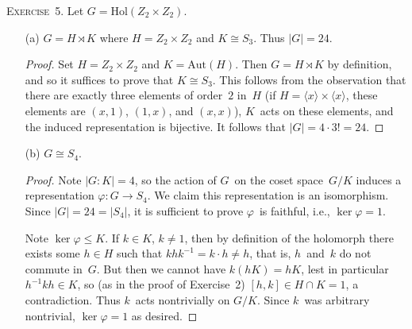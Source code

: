 \documentclass[letterpaper]{article}
\newcommand{\exercise}[1]{\goodbreak\noindent\textsc{Exercise~{#1}.}}
\newcommand{\iso}{\cong}
\newcommand{\sect}{\cap}
\newcommand{\subgroup}{\le}
\newcommand{\aut}{\mathrm{Aut}}
\newcommand{\hol}{\mathrm{Hol}}
\newcommand{\ord}[1]{|{#1}|}
\newcommand{\gen}[1]{\langle{#1}\rangle}
\newcommand{\gindex}[2]{|{#1}:{#2}|}
\begin{document}
\exercise{5}
Let $G=\hol(Z_2\times Z_2)$.
\begin{enumerate}[itemsep=0pt]
\item[(a)] $G=H\rtimes K$ where $H=Z_2\times Z_2$ and $K\iso S_3$. Thus $\ord{G}=24$.
\begin{proof}
Set $H=Z_2\times Z_2$ and $K=\aut(H)$. Then $G=H\rtimes K$ by definition, and so it suffices to prove that $K\iso S_3$. This follows from the observation that there are exactly three elements of order~$2$ in~$H$ (if $H=\gen{x}\times\gen{x}$, these elements are $(x,1)$, $(1,x)$, and $(x,x)$), $K$~acts on these elements, and the induced representation is bijective. It follows that $\ord{G}=4\cdot 3!=24$.
\end{proof}
\item[(b)] $G\iso S_4$.
\begin{proof}
Note $\gindex{G}{K}=4$, so the action of $G$~on the coset space~$G/K$ induces a representation $\varphi:G\to S_4$. We claim this representation is an isomorphism. Since $\ord{G}=24=\ord{S_4}$, it is sufficient to prove $\varphi$~is faithful, i.e., $\ker\varphi=1$.

Note $\ker\varphi\subgroup K$. If $k\in K$, $k\ne1$, then by definition of the holomorph there exists some $h\in H$ such that $khk^{-1}=k\cdot h\ne h$, that is, $h$~and~$k$ do not commute in~$G$. But then we cannot have $k(hK)=hK$, lest in particular $h^{-1}kh\in K$, so (as in the proof of Exercise~2) $[h,k]\in H\sect K=1$, a contradiction. Thus $k$~acts nontrivially on $G/K$. Since $k$~was arbitrary nontrivial, $\ker\varphi=1$ as desired.
\end{proof}
\end{enumerate}
\end{document}

